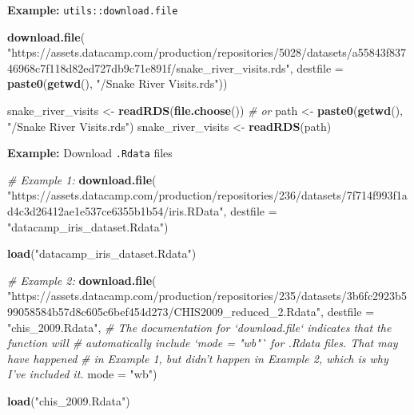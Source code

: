 \documentclass[
]{book}
\newenvironment{Shaded}{\begin{snugshade}}{\end{snugshade}}
\newcommand{\CommentTok}[1]{\textcolor[rgb]{0.56,0.35,0.01}{\textit{#1}}}
\newcommand{\DataTypeTok}[1]{\textcolor[rgb]{0.13,0.29,0.53}{#1}}
\newcommand{\KeywordTok}[1]{\textcolor[rgb]{0.13,0.29,0.53}{\textbf{#1}}}
\newcommand{\NormalTok}[1]{#1}
\newcommand{\StringTok}[1]{\textcolor[rgb]{0.31,0.60,0.02}{#1}}
\begin{document}
\textbf{Example:} \texttt{utils::download.file}

\begin{Shaded}
\begin{Highlighting}[]
\KeywordTok{download.file}\NormalTok{(}
  \StringTok{"https://assets.datacamp.com/production/repositories/5028/datasets/a55843f83746968c7f118d82ed727db9c71e891f/snake_river_visits.rds"}\NormalTok{,}
  \DataTypeTok{destfile =} \KeywordTok{paste0}\NormalTok{(}\KeywordTok{getwd}\NormalTok{(), }\StringTok{"/Snake River Visits.rds"}\NormalTok{))}

\NormalTok{snake_river_visits <-}\StringTok{ }\KeywordTok{readRDS}\NormalTok{(}\KeywordTok{file.choose}\NormalTok{())}
\CommentTok{# or}
\NormalTok{path <-}\StringTok{ }\KeywordTok{paste0}\NormalTok{(}\KeywordTok{getwd}\NormalTok{(), }\StringTok{"/Snake River Visits.rds"}\NormalTok{)}
\NormalTok{snake_river_visits <-}\StringTok{ }\KeywordTok{readRDS}\NormalTok{(path)}
\end{Highlighting}
\end{Shaded}

\textbf{Example:} Download \texttt{.Rdata} files

\begin{Shaded}
\begin{Highlighting}[]
\CommentTok{# Example 1:}
\KeywordTok{download.file}\NormalTok{(}
  \StringTok{"https://assets.datacamp.com/production/repositories/236/datasets/7f714f993f1ad4c3d26412ae1e537ce6355b1b54/iris.RData"}\NormalTok{, }
  \DataTypeTok{destfile =} \StringTok{"datacamp_iris_dataset.Rdata"}\NormalTok{)}

\KeywordTok{load}\NormalTok{(}\StringTok{"datacamp_iris_dataset.Rdata"}\NormalTok{)}

\CommentTok{# Example 2:}
\KeywordTok{download.file}\NormalTok{(}
  \StringTok{"https://assets.datacamp.com/production/repositories/235/datasets/3b6fc2923b599058584b57d8c605c6bef454d273/CHIS2009_reduced_2.Rdata"}\NormalTok{,}
  \DataTypeTok{destfile =} \StringTok{"chis_2009.Rdata"}\NormalTok{,}
  \CommentTok{# The documentation for `download.file` indicates that the function will}
  \CommentTok{# automatically include `mode = "wb"` for .Rdata files. That may have happened}
  \CommentTok{# in Example 1, but didn't happen in Example 2, which is why I've included it.}
  \DataTypeTok{mode =} \StringTok{"wb"}\NormalTok{)}

\KeywordTok{load}\NormalTok{(}\StringTok{"chis_2009.Rdata"}\NormalTok{)}
\end{Highlighting}
\end{Shaded}
\end{document}
